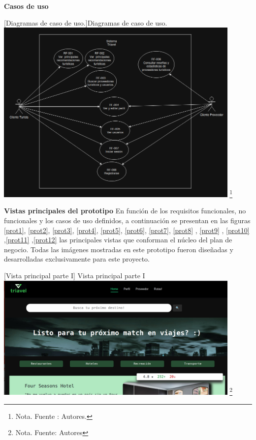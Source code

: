 \textbf{Casos de uso}
    \vspace{2mm}
    \begin{minipage}{0.9\textwidth}
    \centering
    [{Diagramas de caso de uso.}]{Diagramas de caso de uso.}
    \label{caso1}
    \includegraphics[width=0.9\textwidth]{Content/Images/CasosDeUso.png}
    \footnote{Nota. \textup{Fuente : Autores.}}
    \end{minipage}


\textbf{Vistas principales del prototipo}
En función de los requisitos funcionales, no funcionales y los casos de uso definidos, a continuación se presentan en las figuras \ref{prot1}, \ref{prot2}, \ref{prot3}, \ref{prot4}, \ref{prot5}, \ref{prot6}, \ref{prot7}, \ref{prot8} , \ref{prot9} , \ref{prot10} ,\ref{prot11} ,\ref{prot12} las principales vistas que conforman el núcleo del plan de negocio. Todas las imágenes mostradas en este prototipo fueron diseñadas y desarrolladas exclusivamente para este proyecto.

    \vspace{2mm}
    \begin{minipage}{0.9\textwidth}
    \centering
    [{Vista principal parte I}]{ Vista principal parte I}
    \label{prot1}
    \includegraphics[width=0.9\textwidth]{Content/Images/VistaGeneral1.png}
    \footnote{Nota. \textup{Fuente: Autores}}
    \end{minipage}

